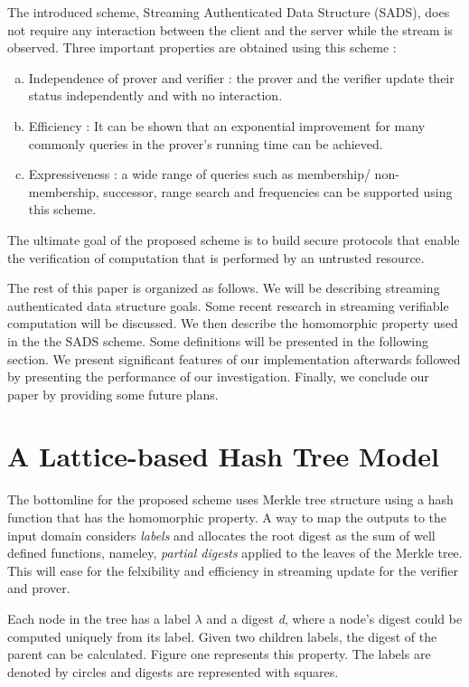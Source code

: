 \documentclass[11pt, letterpaper, oneside]{article}
\begin{document}
	The introduced scheme, Streaming Authenticated Data Structure (SADS), does not require any interaction between the client and the server while the stream is observed.
	Three important properties are obtained using this scheme :
	\begin{enumerate}[a.]
		\item Independence of prover and verifier : the prover and the verifier update their status independently and with no interaction.
		\item Efficiency : It can be shown that an exponential improvement for many commonly queries in the prover's running time can be achieved.
		\item Expressiveness : a wide range of queries such as membership/ non-membership, successor, range search and frequencies can be supported using this scheme.
	\end{enumerate} 
	The ultimate goal of the proposed scheme is to build secure protocols that enable the verification of computation 	that is performed by an untrusted resource.
	
	The rest of this paper is organized as follows. We will be describing streaming authenticated data structure goals.
	Some recent research in streaming verifiable computation will be discussed.
	We then describe the homomorphic property used in the the SADS scheme. Some definitions will be presented in the following section.
	We present significant features of our implementation afterwards followed by presenting the performance of our investigation.
	Finally, we conclude our paper by providing some future plans.
	
	\section{A Lattice-based Hash Tree Model}
	
	The bottomline for the proposed scheme uses Merkle tree structure using a hash function that has the homomorphic property.
	A way to map the outputs to the input domain considers \textit{labels} and allocates the root digest as	the sum of well defined functions, nameley, \textit{partial digests} applied to the leaves of the Merkle tree.
	This will ease for the felxibility and efficiency in streaming update for the verifier and prover.
	
	Each node in the tree has a label $\lambda$ and a digest \textit{d}, where a node's digest could be computed uniquely from its label.
	Given two children labels, the digest of the parent can be calculated. 
	Figure one represents this property. The labels are denoted by circles and digests are 
	represented with squares.
	
\end{document}
